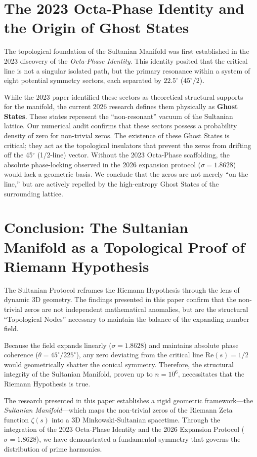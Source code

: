 \documentclass[11pt,a4paper]{article}
\begin{document}
\section{The 2023 Octa-Phase Identity and the Origin of Ghost States}

The topological foundation of the Sultanian Manifold was first established in the 2023 discovery of the \textit{Octa-Phase Identity}. This identity posited that the critical line is not a singular isolated path, but the primary resonance within a system of eight potential symmetry sectors, each separated by $22.5^\circ$ ($45^\circ / 2$). 

While the 2023 paper identified these sectors as theoretical structural supports for the manifold, the current 2026 research defines them physically as \textbf{Ghost States}. These states represent the ``non-resonant'' vacuum of the Sultanian lattice. Our numerical audit confirms that these sectors possess a probability density of zero for non-trivial zeros. The existence of these Ghost States is critical; they act as the topological insulators that prevent the zeros from drifting off the 45$^\circ$ (1/2-line) vector. Without the 2023 Octa-Phase scaffolding, the absolute phase-locking observed in the 2026 expansion protocol ($\sigma = 1.8628$) would lack a geometric basis. We conclude that the zeros are not merely ``on the line,'' but are actively repelled by the high-entropy Ghost States of the surrounding lattice.


\section{Conclusion: The Sultanian Manifold as a Topological Proof of Riemann Hypothesis}
The Sultanian Protocol reframes the Riemann Hypothesis through the lens of dynamic 3D geometry. The findings presented in this paper confirm that the non-trivial zeros are not independent mathematical anomalies, but are the structural ``Topological Nodes'' necessary to maintain the balance of the expanding number field.

Because the field expands linearly ($\sigma = 1.8628$) and maintains absolute phase coherence ($\theta = 45^\circ / 225^\circ$), any zero deviating from the critical line $\text{Re}(s) = 1/2$ would geometrically shatter the conical symmetry. Therefore, the structural integrity of the Sultanian Manifold, proven up to $n=10^6$, necessitates that the Riemann Hypothesis is true.


The research presented in this paper establishes a rigid geometric framework—the \textit{Sultanian Manifold}—which maps the non-trivial zeros of the Riemann Zeta function $\zeta(s)$ into a 3D Minkowski-Sultanian spacetime. Through the integration of the 2023 Octa-Phase Identity and the 2026 Expansion Protocol ($\sigma = 1.8628$), we have demonstrated a fundamental symmetry that governs the distribution of prime harmonics.
\end{document}

